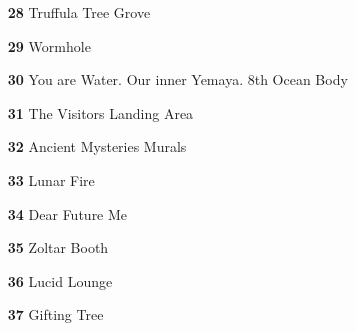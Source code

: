 \begin{itemize}[itemsep=.0125mm,parsep=2pt]
	\item[\textbf{ 28 }] Truffula Tree Grove
	\item[\textbf{ 29 }] Wormhole
	\item[\textbf{ 30 }] You are Water. Our inner Yemaya. 8th Ocean Body
	\item[\textbf{ 31 }] The Visitors Landing Area
	\item[\textbf{ 32 }] Ancient Mysteries Murals
	\item[\textbf{ 33 }] Lunar Fire
	\item[\textbf{ 34 }] Dear Future Me
	\item[\textbf{ 35 }] Zoltar Booth
	\item[\textbf{ 36 }] Lucid Lounge
	\item[\textbf{ 37 }] Gifting Tree
\end{itemize}

\vspace*{\fill}

